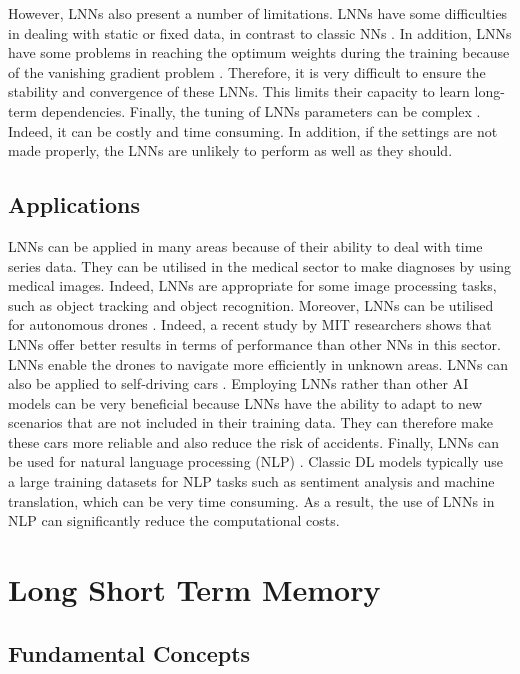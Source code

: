 \documentclass[12pt,oneside]{book} %
\begin{document}
\noindent However, LNNs also present a number of limitations. LNNs have some difficulties in dealing with static or fixed data, in contrast to classic NNs \citep{Keary,Boesch}. In addition, LNNs have some problems in reaching the optimum weights during the training because of the vanishing gradient problem \citep{Keary,Boesch,Sajid}. Therefore, it is very difficult to ensure the stability and convergence of these LNNs. This limits their capacity to learn long-term dependencies. Finally, the tuning of LNNs parameters can be complex \citep{Keary,Boesch,Sajid}. Indeed, it can be costly and time consuming. In addition, if the settings are not made properly, the LNNs are unlikely to perform as well as they should.

\subsection{Applications}

\noindent LNNs can be applied in many areas because of their ability to deal with time series data. They can be utilised in the medical sector \cite{Boesch} to make diagnoses by using medical images. Indeed, LNNs are appropriate for some image processing tasks, such as object tracking and object recognition. Moreover, LNNs can be utilised for autonomous drones \citep{Boesch,Keary}. Indeed, a recent study by MIT researchers shows that LNNs offer better results in terms of performance than other NNs in this sector. LNNs enable the drones to navigate more efficiently in unknown areas. LNNs can also be applied to self-driving cars \citep{Boesch,Keary}. Employing LNNs rather than other AI models can be very beneficial because LNNs have the ability to adapt to new scenarios that are not included in their training data. They can therefore make these cars more reliable and also reduce the risk of accidents. Finally, LNNs can be used for natural language processing (NLP) \citep{Boesch,Sajid}. Classic DL models typically use a large training datasets for NLP tasks such as sentiment analysis and machine translation, which can be very time consuming. As a result, the use of LNNs in NLP can significantly reduce the computational costs.

\section{Long Short Term Memory}

\subsection{Fundamental Concepts}
\end{document}
